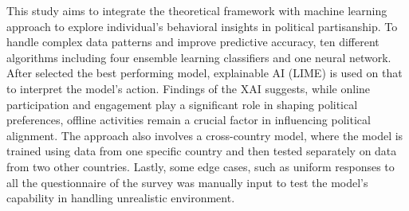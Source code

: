 \documentclass[pt]{article}  %
\begin{document}
This study aims to integrate the theoretical framework with machine learning approach to explore individual's behavioral insights in political partisanship. To handle complex data patterns and improve predictive accuracy, ten different algorithms including four ensemble learning classifiers and one neural network. After selected the best performing model, explainable AI (LIME) is used on that to interpret the model's action. Findings of the XAI suggests, while online participation and engagement play a significant role in shaping political preferences, offline activities remain a crucial factor in influencing political alignment. The approach also involves a cross-country model, where the model is trained using data from one specific country and then tested separately on data from two other countries. Lastly, some edge cases, such as uniform responses to all the questionnaire of the survey was manually input to test the model's capability in handling unrealistic environment. 

\end{document}
